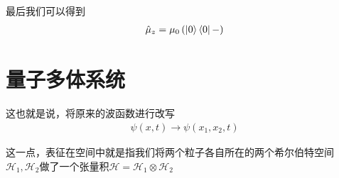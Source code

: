 \documentclass{article}
\begin{document}
最后我们可以得到
\begin{align*}
    \hat{\mu}_z=\mu_0\left(\ket{0}\bra{0}-\right)
\end{align*}





\section{量子多体系统}
这也就是说，将原来的波函数进行改写
\begin{align*}
    \psi(x,t)\longrightarrow \psi(x_1,x_2,t)
\end{align*}

这一点，表征在空间中就是指我们将两个粒子各自所在的两个希尔伯特空间$\mathcal{H}_1,\mathcal{H}_2$做了一个张量积$\mathcal{H}=\mathcal{H}_1\otimes \mathcal{H}_2$
\end{document}
